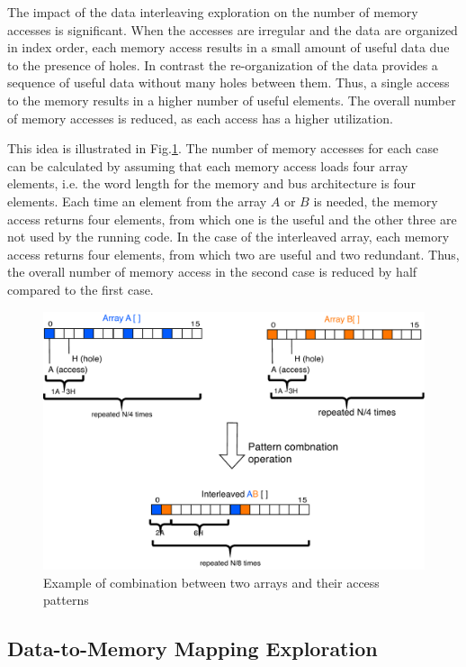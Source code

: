 The impact of the data interleaving exploration on the number of memory accesses is significant.
When the accesses are irregular and the data are organized in index order, each memory access results in a small amount of useful data due to the presence of holes.
In contrast the re-organization of the data provides a sequence of useful data without many holes between them.
Thus, a single access to the memory results in a higher number of useful elements.
The overall number of memory accesses is reduced, as each access has a higher utilization.

This idea is illustrated in Fig.\ref{fig:algebra}.
The number of memory accesses for each case can be calculated by assuming that each memory access loads four array elements, i.e. the word length for the memory and bus architecture is four elements.
Each time an element from the array $A$ or $B$ is needed, the memory access returns four elements, from which one is the useful and the other three are not used by the running code.
In the case of the interleaved array, each memory access returns four elements, from which two are useful and two redundant.
Thus, the overall number of memory access in the second case is reduced by half compared to the first case.

\begin{figure}
\centering
	\includegraphics[scale = 0.6]{D/Images/Algebra.pdf} 
	\caption{Example of combination between two arrays and their access patterns}
	\label{fig:algebra}
\end{figure}

\subsection{Data-to-Memory Mapping Exploration}

